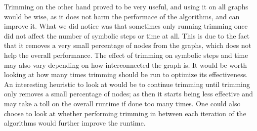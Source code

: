 \documentclass[../master/master.tex]{subfiles}
\begin{document}
Trimming on the other hand proved to be very useful, and using it on all graphs would be wise, as it does not harm the performace of the algorithms, and can improve it. What we did notice was that sometimes only running trimming once did not affect the number of symbolic steps or time at all. This is due to the fact that it removes a very small percentage of nodes from the graphs, which does not help the overall performance. The effect of trimming on symbolic steps and time may also vary depending on how interconnected the graph is. It would be worth looking at how many times trimming should be run to optimize its effectiveness. An interesting heuristic to look at would be to continue trimming until trimming only removes a small percentage of nodes; as then it starts being less effective and may take a toll on the overall runtime if done too many times. One could also choose to look at whether performing trimming in between each iteration of the algorithms would further improve the runtime.
\end{document}

